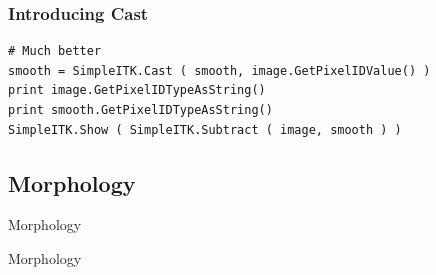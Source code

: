 \begin{frame}[fragile]
\frametitle{Introducing Cast}
\lstpython
\begin{lstlisting}
# Much better
smooth = SimpleITK.Cast ( smooth, image.GetPixelIDValue() )
print image.GetPixelIDTypeAsString()
print smooth.GetPixelIDTypeAsString()
SimpleITK.Show ( SimpleITK.Subtract ( image, smooth ) )
\end{lstlisting}
\end{frame}

\subsection{Morphology}

\begin{frame}{Morphology}
\fontsize{36pt}{36pt}\selectfont
\center
\begin{center}
Morphology
\end{center}
\end{frame}

